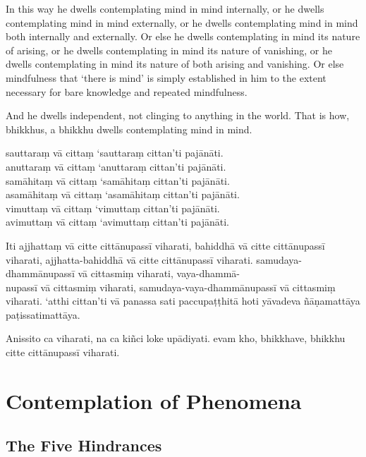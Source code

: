 In this way he dwells contemplating mind in mind internally, or he dwells
contemplating mind in mind externally, or he dwells contemplating mind in mind
both internally and externally. Or else he dwells contemplating in mind its
nature of arising, or he dwells contemplating in mind its nature of vanishing,
or he dwells contemplating in mind its nature of both arising and vanishing. Or
else mindfulness that ‘there is mind’ is simply established in him to the extent
necessary for bare knowledge and repeated mindfulness.

And he dwells independent, not clinging to anything in the world. That is how,
bhikkhus, a bhikkhu dwells contemplating mind in mind.


\paliPage

sauttaraṃ vā cittaṃ ‘sauttaraṃ cittan’ti pajānāti.\\
anuttaraṃ vā cittaṃ ‘anuttaraṃ cittan’ti pajānāti.\\
samāhitaṃ vā cittaṃ ‘samāhitaṃ cittan’ti pajānāti.\\
asamāhitaṃ vā cittaṃ ‘asamāhitaṃ cittan’ti pajānāti.\\
vimuttaṃ vā cittaṃ ‘vimuttaṃ cittan’ti pajānāti.\\
avimuttaṃ vā cittaṃ ‘avimuttaṃ cittan’ti pajānāti.

Iti ajjhattaṃ vā citte cittānupassī viharati, bahiddhā vā citte cittānupassī
viharati, ajjhatta-bahiddhā vā citte cittānupassī viharati. samudaya-dhammānupassī
vā cittasmiṃ viharati, vaya-dhammā-\\
nupassī vā cittasmiṃ viharati, samudaya-vaya-dhammānupassī vā cittasmiṃ viharati.
‘atthi cittan’ti vā panassa sati paccupaṭṭhitā hoti yāvadeva ñāṇamattāya
paṭissatimattāya.

Anissito ca viharati, na ca kiñci loke upādiyati. evam kho, bhikkhave, bhikkhu
citte cittānupassī viharati.


\englishPage

\paliPage

\englishPage
\chapter{Contemplation of Phenomena}

\section{The Five Hindrances}

